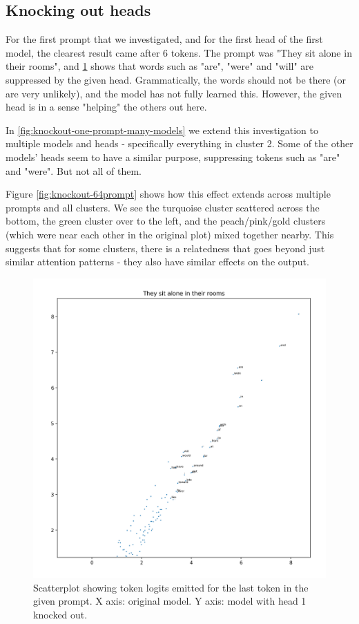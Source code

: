\documentclass{article}
\begin{document}
\subsection{Knocking out heads}

For the first prompt that we investigated, and for the first head of the first model, the clearest result came after 6 tokens. The prompt was "They sit alone in their rooms", and \ref{fig:knockout-one-prompt} shows that words such as "are", "were" and "will" are suppressed by the given head. Grammatically, the words should not be there (or are very unlikely), and the model has not fully learned this. However, the given head is in a sense "helping" the others out here.

In \ref{fig:knockout-one-prompt-many-models} we extend this investigation to multiple models and heads - specifically everything in cluster 2. Some of the other models' heads seem to have a similar purpose, suppressing tokens such as "are" and "were". But not all of them.

Figure \ref{fig:knockout-64prompt} shows how this effect extends across multiple prompts and all clusters. We see the turquoise cluster scattered across the bottom, the green cluster over to the left, and the peach/pink/gold clusters (which were near each other in the original plot) mixed together nearby. This suggests that for some clusters, there is a relatedness that goes beyond just similar attention patterns - they also have similar effects on the output.

\begin{figure}
	\includegraphics[width=\textwidth]{images/knockout-one-prompt.png}
	\caption{Scatterplot showing token logits emitted for the last token in the given prompt. X axis: original model. Y axis: model with head 1 knocked out.}
	\label{fig:knockout-one-prompt}
\end{figure}
\end{document}
